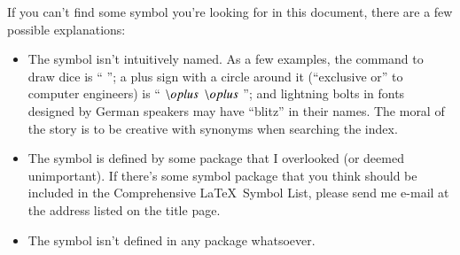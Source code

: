 \documentclass{article}
\makeatletter
\newcommand{\doctitle}{Comprehensive \LaTeX\ Symbol List}  %
\newcommand{\pkgname}[1]{%
  \textsf{#1}%
  \index{#1=\textsf{#1} (package)}%
  \index{packages>\textsf{#1}}}
\newcommand{\PSfont}[1]{%
  #1%
  \index{#1 (PostScript font)}%
  \index{fonts, PostScript>#1}%
  \index{PostScript fonts}%
}
\newcommand{\latex}{\LaTeX\index{LaTeX=\string\LaTeX}\xspace}
\newcommand{\latexE}{\LaTeXe\index{LaTeX2e=\string\LaTeXe}\xspace}
\newcommand{\tex}{\TeX\index{TeX=\string\TeX}\xspace}
\newcommand{\fntenc}[1][]{%
  \def\firstarg{#1}%
  font encoding%
  \ifx\firstarg\empty%
    \index{font encodings}%
  \else
    \index{font encodings>\firstarg}%
  \fi
}
\newif\ifcomplete
\newif\ifOTII
\newcommand{\indexcommand}[2][]{%
    \edef\sanitized{\expandafter\sanitize\string#2!!!}%
    \def\first@arg{#1}%
    \ifx\first@arg\@empty
      \expandafter\index\expandafter{\sanitized=\string\verb+\string#2+}%
    \else
      \expandafter\index\expandafter{\sanitized=\string\verb+\string#2+ (#1)}%
    \fi
  }
\def\cmd#1{\texttt{\string#1}\indexcommand{#1}}
\newcommand{\cmdI}[2][]{%
  \def\first@arg{#1}%
  \ifx\first@arg\@empty
    \texttt{\string#2}\indexcommand[#2]{#2}%
  \else
    \texttt{\string#2}\indexcommand[#1]{#2}%
  \fi
}
\newcommand{\cmdX}[1]{\cmdI[$\string#1$]{#1}}
\makeatother
\begin{document}
If you can't find some symbol you're looking for in this document, there
are a few possible explanations:

\begin{itemize}
  \item The symbol isn't intuitively named.  As a few examples, the
  command to draw dice is ``\cmd{\Cube}''; a plus sign
  with a circle around it (``exclusive or'' to
  computer engineers) is ``\cmdX{\oplus}''; and lightning bolts in
  fonts designed by German speakers may have ``blitz'' in their names.
  The moral of the story is to be creative with synonyms when
  searching the index.

  \item The symbol is defined by some package that I overlooked (or
  deemed unimportant).  If there's some symbol package that you think
  should be included in the \doctitle, please send me e-mail at the
  address listed on the title page.

  \item The symbol isn't defined in any package whatsoever.
\end{itemize}

\ifcomplete
  Even in the last case, all is not lost.  Sometimes, a symbol exists
  in a font, but there is no \latex{} binding for it.  For example,
  the PostScript \PSfont{Symbol} font contains a
  ``\Pisymbol{psy}{191}''\index{arrows} symbol, which may be useful
  for representing a carriage\index{carriage return} return, but there
  is no package for accessing that symbol (as far as I know).  To
  produce an unnamed symbol, you need to switch to the font explicitly
  with \latexE's low-level font commands~\cite{fntguide} and use
  \tex's primitive \cmd{\char} command~\cite{Knuth:ct-a} to request a
  specific character number in the font.\footnote{\pkgname{pifont}
  defines a convenient \cmd{\Pisymbol} command for accessing symbols
  in PostScript\index{PostScript fonts} fonts by number.
  For example,
  ``\cmd{\Pisymbol}\texttt{\string{psy\string}\string{191\string}}''
  produces ``\Pisymbol{psy}{191}''.}
\ifOTII    %
  In fact, \cmd{\char} is not strictly necesssary; the character can
  often be entered symbolically.  For example, the symbol for a
  Tate-Shafarevich\index{Tate-Shafarevich group=Tate-Shafarevich group
  ({\fontencoding{OT2}\selectfont SH})} group
  (``{\fontencoding{OT2}\selectfont SH}'') is actually an uppercase
  \textit{sha} in the Cyrillic\index{alphabets>Cyrillic} alphabet.
  (Cyrillic is supported by the OT2 \fntenc[OT2], for instance).
  While a \textit{sha} can be defined numerically as
  ``\verb|{\fontencoding{OT2}|\linebreak[0]\verb|\selectfont\char88}|''
  it may be more intuitive to use the OT2 \fntenc[OT2]'s ``SH''
  ligature:
  ``\verb|{\fontencoding{OT2}|\linebreak[0]\verb|\selectfont SH}|''.
\fi    %
\end{document}
